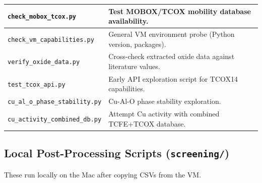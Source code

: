 \documentclass[11pt]{article}
\begin{document}
\begin{table}[H]
\begin{tabular}{|p{2.6in}|p{3.4in}|}
\hline
\texttt{check\_mobox\_tcox.py} & Test MOBOX/TCOX mobility database availability. \\
\hline
\rowcolor{altrow}
\texttt{check\_vm\_capabilities.py} & General VM environment probe (Python version, packages). \\
\hline
\texttt{verify\_oxide\_data.py} & Cross-check extracted oxide data against literature values. \\
\hline
\rowcolor{altrow}
\texttt{test\_tcox\_api.py} & Early API exploration script for TCOX14 capabilities. \\
\hline
\texttt{cu\_al\_o\_phase\_stability.py} & Cu-Al-O phase stability exploration. \\
\hline
\rowcolor{altrow}
\texttt{cu\_activity\_combined\_db.py} & Attempt Cu activity with combined TCFE+TCOX database. \\
\hline
\end{tabular}
\end{table}

\subsection{Local Post-Processing Scripts (\texttt{screening/})}

These run locally on the Mac after copying CSVs from the VM.
\end{document}
